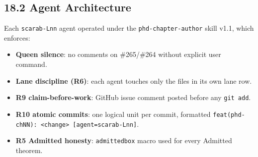 \begin{table}[h]
\caption{Coptic-agent grid campaign statistics}
\label{tab:coptic-stats}
\centering
{}
\end{table}

\subsection{18.2 Agent Architecture}\label{sec:coptic-arch}

Each \texttt{scarab-Lnn} agent operated under the
\texttt{phd-chapter-author} skill v1.1, which enforces:

\begin{itemize}
\item \textbf{Queen silence}: no comments on \#265/\#264 without
  explicit user command.
\item \textbf{Lane discipline (R6)}: each agent touches only the files
  in its own lane row.
\item \textbf{R9 claim-before-work}: GitHub issue comment posted before
  any \texttt{git add}.
\item \textbf{R10 atomic commits}: one logical unit per commit,
  formatted \texttt{feat(phd-chNN): <change> [agent=scarab-Lnn]}.
\item \textbf{R5 Admitted honesty}: \texttt{admittedbox} macro used for
  every Admitted theorem.
\end{itemize}

